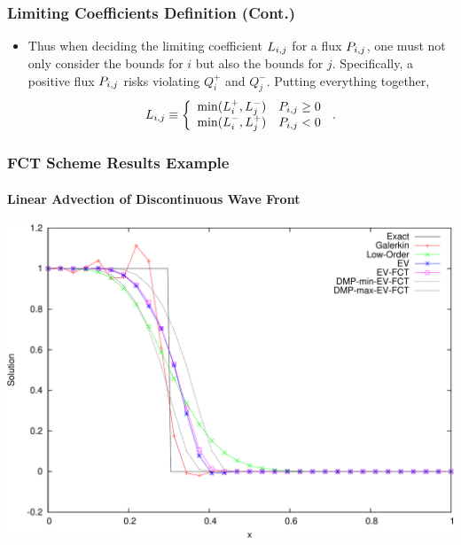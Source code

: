 \documentclass{beamer} \useoutertheme{infolines}
\begin{document}
\begin{frame}
\frametitle{Limiting Coefficients Definition (Cont.)}

\begin{itemize}
   \item Thus when deciding the limiting coefficient $L_{i,j}$ for a flux $\correctionfluxij$, 
      one must not only consider the bounds for $i$ but also the bounds for $j$.
      Specifically, a positive flux $\correctionfluxij$ risks violating $Q_i^+$ and $Q_j^-$.
      Putting everything together,
      \begin{equation}
         L\ij \equiv\left\{
            \begin{array}{l l}
               \min(L_i^+,L_j^-) & \correctionfluxij \geq 0\\
               \min(L_i^-,L_j^+) & \correctionfluxij < 0
            \end{array}
            \right. \eqp
      \end{equation}
\end{itemize}

\end{frame}
\begin{frame}
\frametitle{FCT Scheme Results Example}
\framesubtitle{Linear Advection of Discontinuous Wave Front}

\includegraphics[width=\textwidth]{./figures/advection_FCT.pdf}

\end{frame}
\end{document}
